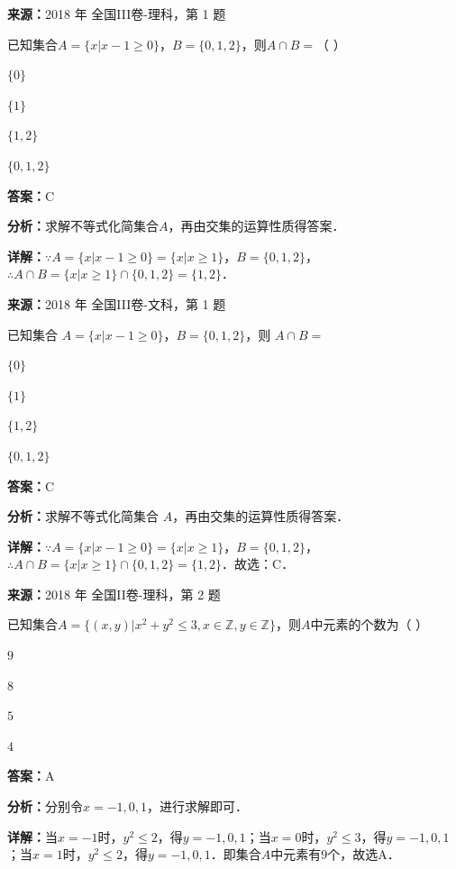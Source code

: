 \begin{question}[points=5]
\textbf{来源：}2018 年 全国III卷-理科，第 1 题\par
已知集合$A=\{x|x-1\geq 0\}$，$B=\{0,1,2\}$，则$A\cap B=$（ ）
\begin{choices}
  \item $\{0\}$
  \item $\{1\}$
  \item $\{1,2\}$
  \item $\{0,1,2\}$
\end{choices}
\begin{solution}
\textbf{答案：}C

\textbf{分析：}求解不等式化简集合$A$，再由交集的运算性质得答案．

\textbf{详解：}$\because A=\{x|x-1\geq 0\}=\{x|x\geq 1\}$，$B=\{0,1,2\}$，$\therefore A\cap B=\{x|x\geq 1\}\cap\{0,1,2\}=\{1,2\}$．
\end{solution}
\end{question}

\begin{question}[points=5]
\textbf{来源：}2018 年 全国III卷-文科，第 1 题\par
已知集合 $A=\{x|x-1\ge 0\}$，$B=\{0,1,2\}$，则 $A\cap B=$
\begin{choices}
  \item $\{0\}$
  \item $\{1\}$
  \item $\{1,2\}$
  \item $\{0,1,2\}$
\end{choices}
\begin{solution}
\textbf{答案：}C

\textbf{分析：}求解不等式化简集合 $A$，再由交集的运算性质得答案．

\textbf{详解：}$\because A=\{x|x-1\ge 0\}=\{x|x\ge 1\}$，$B=\{0,1,2\}$，$\therefore A\cap B=\{x|x\ge 1\}\cap\{0,1,2\}=\{1,2\}$．故选：C．
\end{solution}
\end{question}

\begin{question}[points=5]
\textbf{来源：}2018 年 全国II卷-理科，第 2 题\par
已知集合$A=\{(x,y)|x^2+y^2\le 3, x\in \mathbb{Z}, y\in \mathbb{Z}\}$，则$A$中元素的个数为（     ）
\begin{choices}
  \item $9$
  \item $8$
  \item $5$
  \item $4$
\end{choices}
\begin{solution}
\textbf{答案：}A

\textbf{分析：}分别令$x=-1,0,1$，进行求解即可．

\textbf{详解：}当$x=-1$时，$y^2\le 2$，得$y=-1,0,1$；当$x=0$时，$y^2\le 3$，得$y=-1,0,1$；当$x=1$时，$y^2\le 2$，得$y=-1,0,1$．即集合$A$中元素有$9$个，故选A．
\end{solution}
\end{question}

